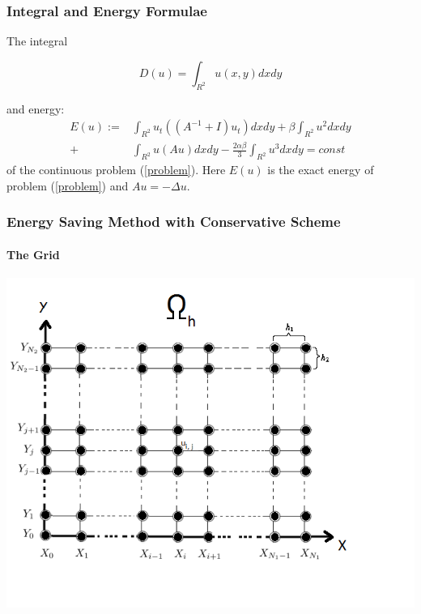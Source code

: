 \documentclass{beamer}
\newcommand{\rf}[1]{(\ref{#1})}
\begin{document}
\begin{frame}
\frametitle{Integral and Energy Formulae}
The integral 

\begin{equation}\label{int}
D(u)=\int_{R^2} u(x,y)dx dy
\end{equation}

and energy:
\begin{align}\label{ex-en}
E(u):=&\int_{R^2} u_t \left((A^{-1}+I)u_t\right) dxdy+
\beta \int_{R^2} u^2 dxdy \nonumber\\
+& \int_{R^2}u \left(A u\right) dxdy
-\frac{2 \alpha \beta}{3} \int_{R^2} u^3 dxdy =const
\end{align}
of the continuous problem \rf{problem}. Here $E(u)$ is the exact energy of problem \rf{problem} and $Au=-\Delta u$.
\end{frame}

\begin{frame}
\frametitle{Energy Saving Method with Conservative Scheme}
\framesubtitle{The Grid}

\begin{center}\vspace{0.4cm}
	\begin{minipage}[b]{0.6\linewidth}
		\includegraphics[width=\linewidth]{Omega_dah.png}
	\end{minipage}
\end{center}

\end{frame}
\end{document}
